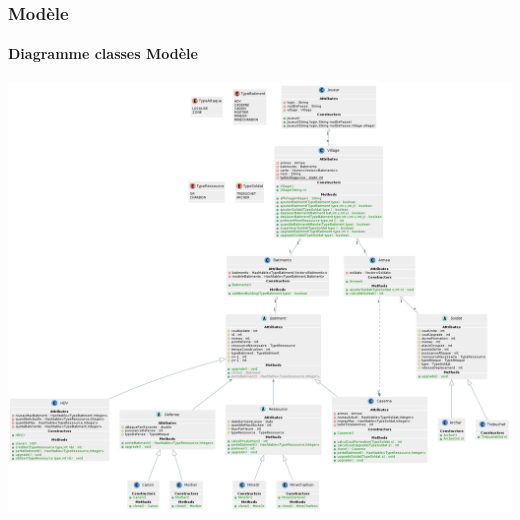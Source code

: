 \documentclass[aspectratio=169]{beamer}
\begin{document}
    \begin{frame}
        \frametitle{Modèle}
        \framesubtitle{Diagramme classes Modèle}
        \begin{center}
            \includegraphics[scale=0.13]{images/ClassesModel.png}
        \end{center}
    \end{frame}
\end{document}

